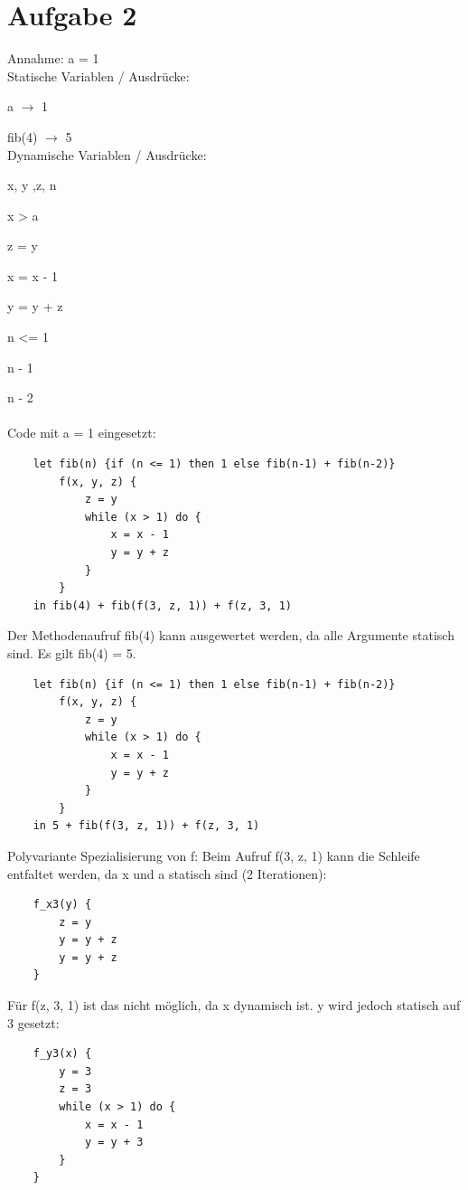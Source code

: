 \documentclass[11pt,a4paper]{article}
\begin{document}
\section{Aufgabe 2}
Annahme: a = 1\\
Statische Variablen / Ausdrücke: 

    a $\rightarrow$ 1

    fib(4) $\rightarrow$ 5\\

Dynamische Variablen / Ausdrücke:

    x, y ,z, n

    x > a

    z = y

    x = x - 1

    y = y + z

    n <= 1

    n - 1

    n - 2\\\\
Code mit a = 1 eingesetzt:
\begin{verbatim}
    let fib(n) {if (n <= 1) then 1 else fib(n-1) + fib(n-2)}
        f(x, y, z) {
            z = y
            while (x > 1) do {
                x = x - 1
                y = y + z
            }
        }
    in fib(4) + fib(f(3, z, 1)) + f(z, 3, 1)
\end{verbatim}
Der Methodenaufruf fib(4) kann ausgewertet werden, da alle Argumente statisch sind. Es gilt fib(4) = 5.\\

\begin{verbatim}
    let fib(n) {if (n <= 1) then 1 else fib(n-1) + fib(n-2)}
        f(x, y, z) {
            z = y
            while (x > 1) do {
                x = x - 1
                y = y + z
            }
        }
    in 5 + fib(f(3, z, 1)) + f(z, 3, 1)
\end{verbatim}
Polyvariante Spezialisierung von f:
Beim Aufruf f(3, z, 1) kann die Schleife entfaltet werden, da x und a statisch sind (2 Iterationen):

\begin{verbatim}
    f_x3(y) {
        z = y
        y = y + z
        y = y + z
    }
\end{verbatim}

Für f(z, 3, 1) ist das nicht möglich, da x dynamisch ist. y wird jedoch statisch auf 3 gesetzt:

\begin{verbatim}
    f_y3(x) {
        y = 3
        z = 3
        while (x > 1) do {
            x = x - 1
            y = y + 3
        }
    }
\end{verbatim}
\end{document}
